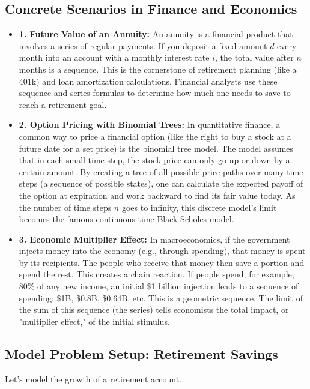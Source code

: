 \documentclass{article}
\begin{document}
\subsection{Concrete Scenarios in Finance and Economics}
\begin{itemize}
    \item \textbf{1. Future Value of an Annuity:} An annuity is a financial product that involves a series of regular payments. If you deposit a fixed amount $d$ every month into an account with a monthly interest rate $i$, the total value after $n$ months is a sequence. This is the cornerstone of retirement planning (like a 401k) and loan amortization calculations. Financial analysts use these sequence and series formulas to determine how much one needs to save to reach a retirement goal.

    \item \textbf{2. Option Pricing with Binomial Trees:} In quantitative finance, a common way to price a financial option (like the right to buy a stock at a future date for a set price) is the binomial tree model. The model assumes that in each small time step, the stock price can only go up or down by a certain amount. By creating a tree of all possible price paths over many time steps (a sequence of possible states), one can calculate the expected payoff of the option at expiration and work backward to find its fair value today. As the number of time steps $n$ goes to infinity, this discrete model's limit becomes the famous continuous-time Black-Scholes model.

    \item \textbf{3. Economic Multiplier Effect:} In macroeconomics, if the government injects money into the economy (e.g., through spending), that money is spent by its recipients. The people who receive that money then save a portion and spend the rest. This creates a chain reaction. If people spend, for example, 80\% of any new income, an initial \$1 billion injection leads to a sequence of spending: \$1B, \$0.8B, \$0.64B, etc. This is a geometric sequence. The limit of the sum of this sequence (the series) tells economists the total impact, or "multiplier effect," of the initial stimulus.
\end{itemize}

\subsection{Model Problem Setup: Retirement Savings}
Let's model the growth of a retirement account.
\end{document}
